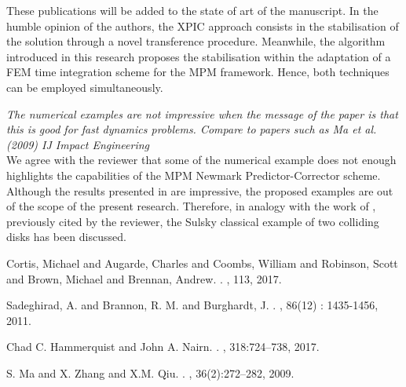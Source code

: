\documentclass[12pt]{article}
\begin{document}
\begin{enumerate}
These publications will be added to the state of art of the manuscript. In the humble opinion of the authors, the XPIC approach consists in the stabilisation of the solution through a novel transference procedure. Meanwhile, the algorithm introduced in this research proposes the stabilisation within the adaptation of a FEM time integration scheme for the MPM framework. Hence, both techniques can be employed simultaneously.

\end{enumerate}

 \textit{The numerical examples are not impressive when the message of the paper is that this is good for fast dynamics problems. Compare to papers such as Ma et al. (2009) IJ Impact Engineering}\\

We agree with the reviewer that some of the numerical example does not enough highlights the capabilities of the MPM Newmark Predictor-Corrector scheme. Although the results presented in \cite{MA2009272} are impressive, the proposed examples are out of the scope of the present research. Therefore, in analogy with the work of \cite{HAMMERQUIST2017724}, previously cited by the reviewer, the Sulsky classical example of two colliding disks has been discussed. 


\begin{thebibliography}{10}

Cortis, Michael and Augarde, Charles and Coombs, William and Robinson, Scott and Brown, Michael and Brennan, Andrew.
.
, 113, 2017.

Sadeghirad, A. and Brannon, R. M. and Burghardt, J.
.
, 86(12) : 1435-1456, 2011.


Chad C. Hammerquist and John A. Nairn.
.
,  318:724--738, 2017.


S. Ma and X. Zhang and X.M. Qiu.
.
, 36(2):272--282, 2009.

\end{thebibliography}
\end{document}
